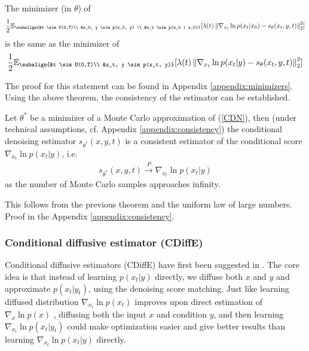 \begin{theorem}
    \label{thm:CDE_consistency}
    The minimizer (in $\theta$) of
    \begin{gather*}
    \begin{aligned}
            \frac{1}{2} \mathbb{E}_{\subalign{&t \sim U(0,T)\\ &x_0, y \sim p(x_0, y) \\ &x_t \sim p(x_t | x_0)}} 
            [\lambda(t) \norm{\nabla_{x_t} \ln{p(x_t | x_0)} - s_\theta(x_t, y, t)}_2^2]
    \end{aligned}
    \end{gather*}    
    is the same as the minimizer of 
    \begin{gather*}
        \frac{1}{2} \mathbb{E}_{\subalign{&t \sim U(0,T)\\ &x_t, y \sim p(x_t, y)}} 
        [\lambda(t) \norm{\nabla_{x_t} \ln{p(x_t | y)} - s_\theta(x_t, y,t)}_2^2]
    \end{gather*}
\end{theorem}
\noindent
The proof for this statement can be found in Appendix \ref{appendix:minimizers}. 
Using the above theorem, the consistency of the estimator can be established.
\begin{corollary}
    Let $\theta^\ast$ be a minimizer of a Monte Carlo approximation of (\ref{CDN}), then (under technical assumptions, cf. Appendix \ref{appendix:consistency}) the conditional denoising estimator $s_{\theta^\ast}(x,y,t)$ is a consistent estimator of the conditional score $\nabla_{x_t} \ln p(x_t | y)$, i.e.
    \begin{gather*}
        s_{\theta^\ast}(x,y,t) \overset{P}{\to} \nabla_{x_t} \ln p(x_t | y)   
    \end{gather*}
    as the number of Monte Carlo samples approaches infinity.
\end{corollary}
\noindent
This follows from the previous theorem and the uniform law of large numbers. Proof in the Appendix \ref{appendix:consistency}.

\subsubsection{Conditional diffusive estimator (CDiffE)}
\label{sec:CDiffE}
Conditional diffusive estimators (CDiffE) have first been suggested in \cite{song2021sde}. The core idea is that instead of learning $p(x_t | y)$ directly, we diffuse both $x$ and $y$ and approximate $p(x_t | y_t)$, using the denoising score matching. Just like learning diffused distribution $\nabla_{x_t} \ln p(x_t)$ improves upon direct estimation of $\nabla_{x} \ln p(x)$ \cite{song2020generative_score, song2021sde}, diffusing both the input $x$ and condition $y$, and then learning $\nabla_{x_t} \ln p(x_t | y_t)$ could make optimization easier and give better results than learning  $\nabla_{x_t} \ln p(x_t | y)$ directly.
    
